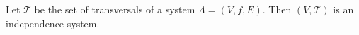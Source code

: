 Let $\mathcal{T}$ be the set of transversals of a system $\Lambda = (V, f, E)$. Then $(V, \mathcal{T})$ is an independence system.
